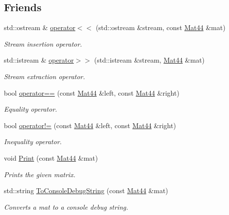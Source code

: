 \subsection*{Friends}
\begin{DoxyCompactItemize}
\item 
std\+::ostream \& \hyperlink{classgofxmath_1_1_mat44_a3fe91a98667ad47a13792a3910edc689}{operator$<$$<$} (std\+::ostream \&stream, const \hyperlink{classgofxmath_1_1_mat44}{Mat44} \&mat)
\begin{DoxyCompactList}\small\item\em Stream insertion operator. \end{DoxyCompactList}\item 
std\+::istream \& \hyperlink{classgofxmath_1_1_mat44_addb2505fe2722a6fe1e02f4f7fefbae6}{operator$>$$>$} (std\+::istream \&stream, \hyperlink{classgofxmath_1_1_mat44}{Mat44} \&mat)
\begin{DoxyCompactList}\small\item\em Stream extraction operator. \end{DoxyCompactList}\item 
bool \hyperlink{classgofxmath_1_1_mat44_af4dc2dcc368fc35c6fd456a0bb87f7a2}{operator==} (const \hyperlink{classgofxmath_1_1_mat44}{Mat44} \&left, const \hyperlink{classgofxmath_1_1_mat44}{Mat44} \&right)
\begin{DoxyCompactList}\small\item\em Equality operator. \end{DoxyCompactList}\item 
bool \hyperlink{classgofxmath_1_1_mat44_acbc1598a85e4db1071aa8b4f005ad422}{operator!=} (const \hyperlink{classgofxmath_1_1_mat44}{Mat44} \&left, const \hyperlink{classgofxmath_1_1_mat44}{Mat44} \&right)
\begin{DoxyCompactList}\small\item\em Inequality operator. \end{DoxyCompactList}\item 
void \hyperlink{classgofxmath_1_1_mat44_a29435fda8e5d65db573dadafee977651}{Print} (const \hyperlink{classgofxmath_1_1_mat44}{Mat44} \&mat)
\begin{DoxyCompactList}\small\item\em Prints the given matrix. \end{DoxyCompactList}\item 
std\+::string \hyperlink{classgofxmath_1_1_mat44_a5d850a4033c3297037241bf1c9ba6223}{To\+Console\+Debug\+String} (const \hyperlink{classgofxmath_1_1_mat44}{Mat44} \&mat)
\begin{DoxyCompactList}\small\item\em Converts a mat to a console debug string. \end{DoxyCompactList}\end{DoxyCompactItemize}
